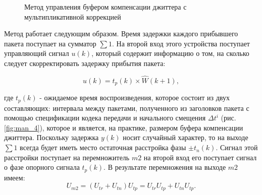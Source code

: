 \begin{figure}[!h]
\caption{Метод управления буфером компенсации джиттера с мультипликативной коррекцией}
\label{fig:man_3}
\end{figure}

Метод работает следующим образом. 
Время задержки каждого прибывшего пакета поступает на сумматор $\sum 1$. 
На второй вход этого устройства поступает управляющий сигнал $u(k)$, который содержит информацию о том, на сколько следует скорректировать задержку прибытия пакета:

\begin{equation}\label{eq41:man13}
u(k)=t_p(k)\times \hat W(k+1),
\end{equation}

\noindent где $t_p(k)$ - ожидаемое время воспроизведения, которое состоит из двух составляющих: интервала между пакетами, полученного из заголовков пакета с помощью спецификации кодека передачи и начального смещения $\Delta t^i$ (рис. \ref{fig:man_4}), которое и является, на практике, размером буфера компенсации джиттера.
Поскольку задержка $y(k)$ носит случайный характер, то на выходе $\sum 1$ всегда будет иметь место остаточная расстройка фазы $\pm t_n(k)$.
Сигнал этой расстройки поступает на перемножитель $m2$ на второй вход его поступает сигнал о фазе опорного сигнала $t_p(k)$. 
В результате перемножения на выходе $m2$ имеем:
\begin{equation}\label{eq41:man14}
U_{m2}=(U_{tr}+U_{tn})U_{tp}=U_{tr}U_{tp}+U_{tn}U_{tp}.
\end{equation}

